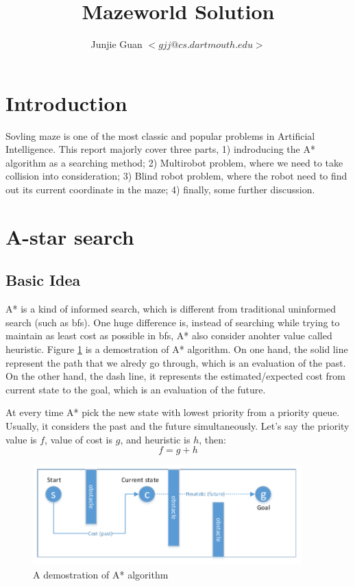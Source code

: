 \documentclass{article}
\title{Mazeworld Solution}
\author{Junjie Guan $<gjj@cs.dartmouth.edu>$}
\begin{document}
\maketitle

\tableofcontents

\section{Introduction}

Sovling maze is one of the most classic and popular problems in Artificial Intelligence. This report majorly cover three parts, 1) indroducing the A* algorithm as a searching method; 2) Multirobot problem, where we need to take collision into consideration; 3) Blind robot problem, where the robot need to find out its current coordinate in the maze; 4) finally, some further discussion.

\clearpage
\section{A-star search}
\subsection{Basic Idea}

A* is a kind of informed search, which is different from traditional uninformed search (such as bfs). One huge difference is, instead of searching while trying to maintain as least cost as possible in bfs, A* also consider anohter value called heuristic. Figure \ref{astar} is a demostration of A* algorithm. On one hand, the solid line represent the path that we alredy go through, which is an evaluation of the past. On the other hand, the dash line, it represents the estimated/expected cost from current state to the goal, which is an evaluation of the future.

At every time A* pick the new state with lowest priority from a priority queue. Usually, it considers the past and the future simultaneously. Let's say the priority value is $f$, value of cost is $g$, and heuristic is $h$, then:
$$f = g + h$$

\begin{figure}[!h]
\centering
\includegraphics[width=0.927\textwidth]{astar.pdf}
\caption{A demostration of A* algorithm}
\label{astar}
\end{figure}
\end{document}
